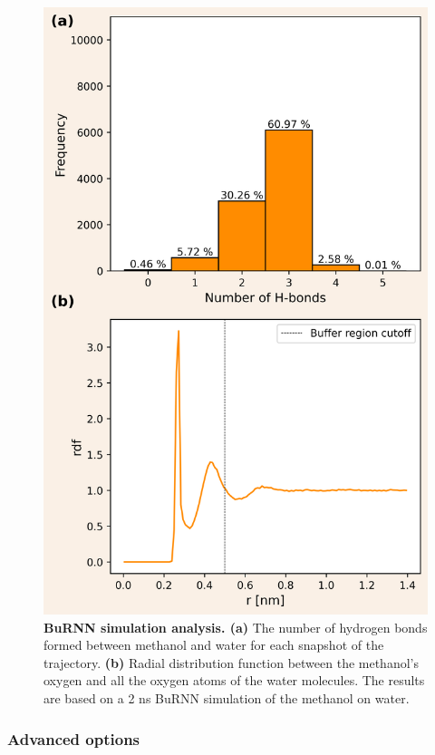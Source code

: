 \begin{figure}[H]
\centering
\includegraphics[scale=.66]{../09_tutorial_06/figures/BuRNN_ana.png}
\caption{\textbf{BuRNN simulation analysis. (a)} The number of hydrogen bonds formed between methanol and water for each snapshot of the trajectory. \textbf{(b)} Radial distribution function between the methanol's oxygen and all the oxygen atoms of the water molecules. The results are based on a 2 ns BuRNN simulation of the methanol on water.}
\label{BuRNN_ana}
\end{figure}



\subsubsection{Advanced options}
